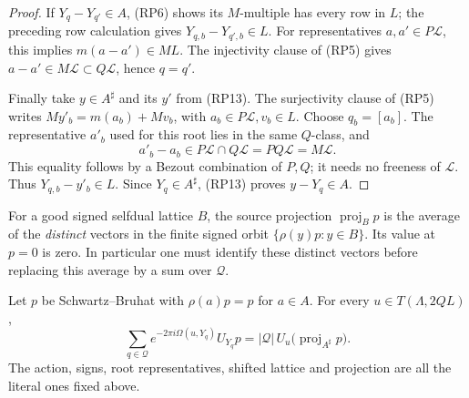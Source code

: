 \begin{proof}
If \(Y_q-Y_{q'}\in A\), (RP6) shows its \(M\)-multiple has
every row in \(L\); the preceding row calculation gives
\(Y_{q,b}-Y_{q',b}\in L\).
For representatives \(a,a'\in P\mathcal L\), this implies
\(m(a-a')\in ML\). The injectivity clause of (RP5) gives
\(a-a'\in M\mathcal L\subset Q\mathcal L\), hence \(q=q'\).

Finally take \(y\in A^\sharp\) and its \(y'\) from (RP13).
The surjectivity clause of (RP5) writes
\(My'_b=m(a_b)+Mv_b\), with \(a_b\in P\mathcal L,v_b\in L\).
Choose \(q_b=[a_b]\). The representative \(a'_b\) used for this
root lies in the same \(Q\)-class, and
\[
 a'_b-a_b\in P\mathcal L\cap Q\mathcal L
                            =PQ\mathcal L=M\mathcal L.
\]
This equality follows by a Bezout combination of \(P,Q\);
it needs no freeness of \(\mathcal L\).
Thus \(Y_{q,b}-y'_b\in L\). Since \(Y_q\in A^\sharp\),
(RP13) proves \(y-Y_q\in A\).
\end{proof}

For a good signed selfdual lattice \(B\), the source projection
\(\operatorname{proj}_B p\) is the average of the \emph{distinct}
vectors in the finite signed orbit
\(\{\rho(y)p:y\in B\}\). Its value at \(p=0\) is zero.
In particular one must identify these distinct vectors before
replacing this average by a sum over \(\mathcal Q\).

\begin{srproposition}
\label{prop:ftb-actual-root-fourier}
Let \(p\) be Schwartz--Bruhat with \(\rho(a)p=p\) for \(a\in A\).
For every \(u\in T(\Lambda,2QL)\),
\[
 \sum_{q\in\mathcal Q}e^{-2\pi i\Omega(u,Y_q)}U_{Y_q}p
       =|\mathcal Q|\,U_u\bigl(\operatorname{proj}_{A^\sharp}p\bigr).
                                                               \tag{RP14}
\]
The action, signs, root representatives, shifted lattice and
projection are all the literal ones fixed above.
\end{srproposition}

